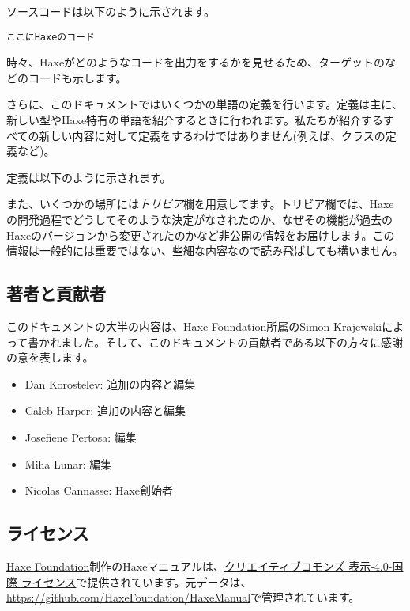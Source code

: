 ソースコードは以下のように示されます。

\begin{lstlisting}
ここにHaxeのコード
\end{lstlisting}

時々、Haxeがどのようなコードを出力をするかを見せるため、ターゲットのなどのコードも示します。

さらに、このドキュメントではいくつかの単語の定義を行います。定義は主に、新しい型やHaxe特有の単語を紹介するときに行われます。私たちが紹介するすべての新しい内容に対して定義をするわけではありません(例えば、クラスの定義など)。

定義は以下のように示されます。


また、いくつかの場所には\emph{トリビア}欄を用意してます。トリビア欄では、Haxeの開発過程でどうしてそのような決定がなされたのか、なぜその機能が過去のHaxeのバージョンから変更されたのかなど非公開の情報をお届けします。この情報は一般的には重要ではない、些細な内容なので読み飛ばしても構いません。


\subsection{著者と貢献者}
\label{introduction-authors-and-contributions}

このドキュメントの大半の内容は、Haxe Foundation所属のSimon Krajewskiによって書かれました。そして、このドキュメントの貢献者である以下の方々に感謝の意を表します。

\begin{itemize}
	\item Dan Korostelev: 追加の内容と編集
	\item Caleb Harper: 追加の内容と編集
	\item Josefiene Pertosa: 編集
	\item Miha Lunar: 編集
	\item Nicolas Cannasse: Haxe創始者
\end{itemize}

\subsection{ライセンス}
\label{introduction-license}

\href{http://haxe.org/foundation}{Haxe Foundation}制作のHaxeマニュアルは、\href{http://creativecommons.org/licenses/by/4.0/}{クリエイティブコモンズ 表示-4.0-国際 ライセンス}で提供されています。元データは、\href{https://github.com/HaxeFoundation/HaxeManual}{https://github.com/HaxeFoundation/HaxeManual}で管理されています。

